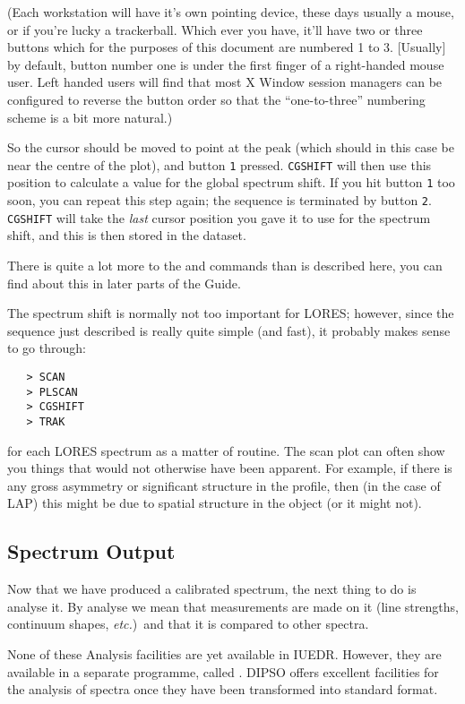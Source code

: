 (Each workstation will have it's own pointing device, these days usually a
mouse, or if you're lucky a trackerball.  Which ever you have, it'll have two
or three buttons which for the purposes of this document are numbered 1 to 3.
[Usually] by default, button number one is under the first finger of a
right-handed mouse user.  Left handed users will find that most X Window
session managers can be configured to reverse the button order so that the
``one-to-three'' numbering scheme is a bit more natural.)

So the cursor should be moved to point at the peak (which should in this case
be near the centre of the plot), and button \verb+1+ pressed.  \verb+CGSHIFT+
will then use this position to calculate a value for the global spectrum shift.
If you hit button \verb+1+ too soon, you can repeat this step again; the
sequence is terminated by button \verb+2+\@. \verb+CGSHIFT+ will take the {\em
last} cursor position you gave it to use for the spectrum shift, and this is
then stored in the dataset.

There is quite a lot more to the 
 and 
 commands than
is described here, you can find about this in later parts of the Guide.

The spectrum shift is normally not too important for LORES; however,
since the sequence just described is really quite simple (and fast), it
probably makes sense to go through:

\begin{verbatim}
   > SCAN
   > PLSCAN
   > CGSHIFT
   > TRAK
\end{verbatim}

for each LORES spectrum as a matter of routine.  The scan plot can often
show you things that would not otherwise have been apparent.  For example, if
there is any gross asymmetry or significant structure in the profile, then (in
the case of LAP) this might be due to spatial structure in the object (or it
might not)\@.


\subsection{Spectrum Output}

Now that we have produced a calibrated spectrum, the next thing to do is
analyse it.  By analyse we mean that measurements are made on it (line
strengths, continuum shapes, {\it etc.})\ and that it is compared to other 
spectra.

None of these Analysis facilities are yet available in IUEDR\@.  However,
they are available in a separate programme, called \@.
DIPSO offers excellent facilities for the analysis of spectra once they
have been transformed into standard format.

